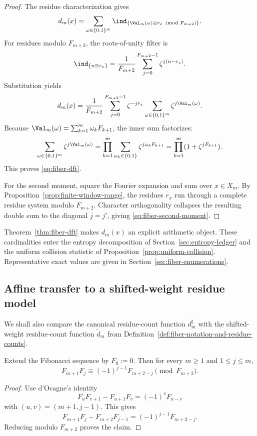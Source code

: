 \begin{proof}
The residue characterization gives
\[
d_m(x)=
\sum_{\omega\in\{0,1\}^m}
\ind_{\{\Val_m(\omega)\equiv r_x\pmod {F_{m+2}}\}}.
\]
For residues modulo $F_{m+2}$, the roots-of-unity filter is
\[
\ind_{\{n\equiv r_x\}}
=
\frac{1}{F_{m+2}}
\sum_{j=0}^{F_{m+2}-1}\zeta^{j(n-r_x)}.
\]
Substitution yields
\[
d_m(x)=
\frac{1}{F_{m+2}}
\sum_{j=0}^{F_{m+2}-1}\zeta^{-jr_x}
\sum_{\omega\in\{0,1\}^m}\zeta^{j\Val_m(\omega)}.
\]
Because $\Val_m(\omega)=\sum_{k=1}^m\omega_kF_{k+1}$, the inner sum
factorizes:
\[
\sum_{\omega\in\{0,1\}^m}\zeta^{j\Val_m(\omega)}
=
\prod_{k=1}^m
\sum_{\omega_k\in\{0,1\}}\zeta^{j\omega_kF_{k+1}}
=
\prod_{k=1}^m(1+\zeta^{jF_{k+1}}).
\]
This proves \eqref{eq:fiber-dft}.

For the second moment, square the Fourier expansion and sum over $x\in X_m$.
By Proposition~\ref{prop:finite-window-range}, the residues
$r_x$ run through a complete residue system modulo $F_{m+2}$.  Character
orthogonality collapses the resulting double sum to the diagonal
$j=j'$, giving \eqref{eq:fiber-second-moment}.
\end{proof}

\begin{remark}
Theorem~\ref{thm:fiber-dft} makes $d_m(x)$ an explicit arithmetic object. These cardinalities enter the entropy decomposition of Section~\ref{sec:entropy-ledger} and the uniform collision statistic of Proposition~\ref{prop:uniform-collision}. Representative exact values are given in Section~\ref{sec:fiber-enumerations}.
\end{remark}

\subsection{Affine transfer to a shifted-weight residue model}\label{sec:stab:transfer}

We shall also compare the canonical residue-count function
$d_m^\sharp$ with the shifted-weight residue-count function
$\widetilde d_m$ from
Definition~\ref{def:fiber-notation-and-residue-counts}.

\begin{lemma}\label{lem:cross-multiplication}
Extend the Fibonacci sequence by $F_0:=0$. Then for every $m\ge 1$ and $1\le j\le m$,
\[
F_{m+1}F_j \equiv (-1)^{j-1}F_{m+2-j}\pmod{F_{m+2}}.
\]
\end{lemma}

\begin{proof}
Use d'Ocagne's identity
\[
F_uF_{v+1}-F_{u+1}F_v = (-1)^vF_{u-v}
\]
with $(u,v)=(m+1,j-1)$. This gives
\[
F_{m+1}F_j-F_{m+2}F_{j-1}=(-1)^{j-1}F_{m+2-j}.
\]
Reducing modulo $F_{m+2}$ proves the claim.
\end{proof}

